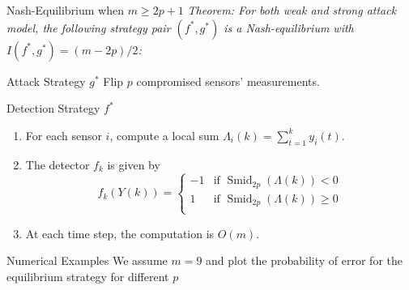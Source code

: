 \documentclass[10pt]{beamer}
\newlength\figureheight
\newlength\figurewidth
\newcommand{\tikzdir}[1]{#1.tikz}
\newcommand{\inputtikz}[1]{}}
\DeclareMathOperator{\Smid}{Smid}
\begin{document}
 
 \begin{frame}{Nash-Equilibrium when $m \geq 2p+1$}
   \it Theorem: For both weak and strong attack model, the following strategy pair $(f^*,g^*)$ is a Nash-equilibrium with $I(f^*,g^*) = (m-2p)/2$:
   \begin{block}{Attack Strategy $g^*$}
     Flip $p$ compromised sensors' measurements.
   \end{block}
   \begin{block}{Detection Strategy $f^*$}
     \begin{enumerate}
     \item For each sensor $i$, compute a local sum $ \Lambda_i(k) = \sum_{t=1}^k y_i(t)$.
     \item The detector $f_k$ is given by
       \begin{displaymath}
         f_k(Y(k)) = \begin{cases}
           -1 &\text{if }\Smid_{2p}(\Lambda(k))< 0\\
           1 &\text{if }\Smid_{2p}(\Lambda(k))\geq 0\\
         \end{cases}
       \end{displaymath}
     \item At each time step, the computation is $O(m)$.
     \end{enumerate}
   \end{block}
 \end{frame}
 
 \begin{frame}{Numerical Examples}
   We assume $m = 9$ and plot the probability of error for the equilibrium strategy for different $p$
   \begin{center}
     \setlength{\figureheight}{7cm}
     \setlength{\figurewidth}{12cm}
     \inputtikz{Perror}
   \end{center}
 \end{frame}
 
\end{document}
